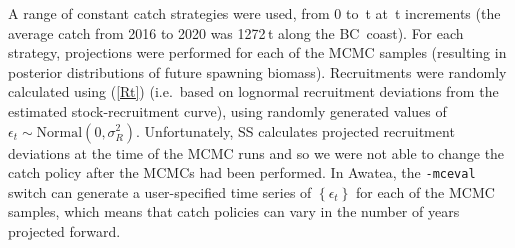 \documentclass[11pt]{book}
\newcommand{\code}[1]{\normalsize\texttt{#1}\normalsize}%
\newcommand{\eref}[1]{(\ref{#1})}
\begin{document}
A range of constant catch strategies were used, from 0 to \policyMax\,t at \policyInc\,t increments (the average catch from 2016 to 2020 was 1272\,t along the BC~coast).
For each strategy, projections were performed for each of the \Nbase{} MCMC samples (resulting in posterior distributions of future spawning biomass).
Recruitments were randomly calculated using \eref{Rt} (i.e.~based on lognormal recruitment deviations from the estimated stock-recruitment curve), using randomly generated values of $\epsilon_t \sim \mbox{Normal}(0, \sigma_R^2)$. 
Unfortunately, SS calculates projected recruitment deviations at the time of the MCMC runs and so we were not able to change the catch policy after the MCMCs had been performed. 
In Awatea, the \code{-mceval} switch can generate a user-specified time series of $\left\{ \epsilon_t \right\}$ for each of the MCMC samples, which means that catch policies can vary in the number of years projected forward.



\renewcommand\bibsection{\section{REFERENCES -- MODEL RESULTS}}

\end{document}
